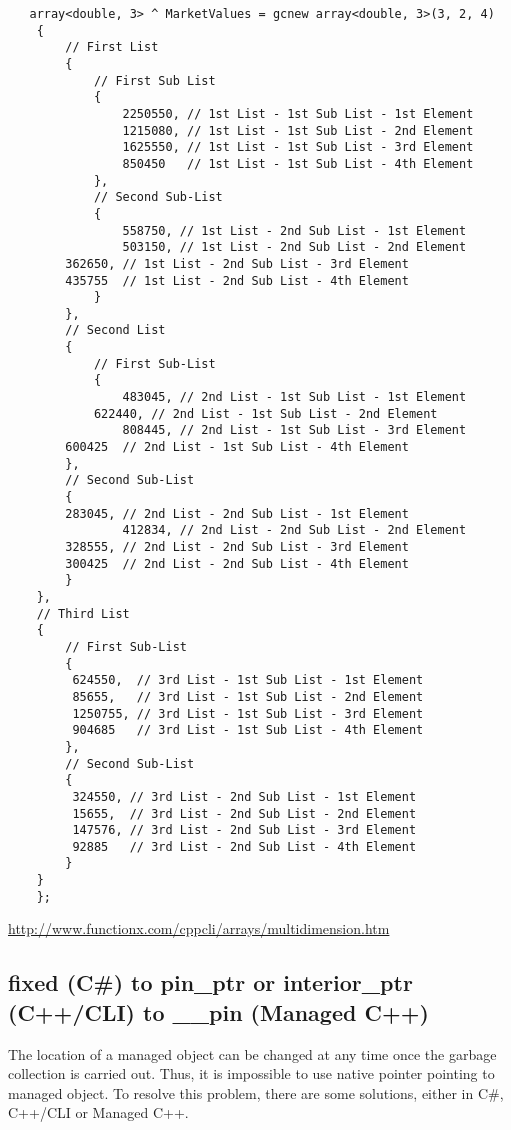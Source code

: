 \begin{verbatim}
   array<double, 3> ^ MarketValues = gcnew array<double, 3>(3, 2, 4)
    {
        // First List
        {
            // First Sub List
            {
                2250550, // 1st List - 1st Sub List - 1st Element
                1215080, // 1st List - 1st Sub List - 2nd Element
                1625550, // 1st List - 1st Sub List - 3rd Element
                850450   // 1st List - 1st Sub List - 4th Element
            },
            // Second Sub-List
            {
                558750, // 1st List - 2nd Sub List - 1st Element
                503150, // 1st List - 2nd Sub List - 2nd Element
		362650, // 1st List - 2nd Sub List - 3rd Element
		435755  // 1st List - 2nd Sub List - 4th Element
            }
        },
        // Second List
        {
            // First Sub-List
            {
                483045, // 2nd List - 1st Sub List - 1st Element
	        622440, // 2nd List - 1st Sub List - 2nd Element
                808445, // 2nd List - 1st Sub List - 3rd Element
		600425  // 2nd List - 1st Sub List - 4th Element
	    },
	    // Second Sub-List
	    {
		283045, // 2nd List - 2nd Sub List - 1st Element
                412834, // 2nd List - 2nd Sub List - 2nd Element
		328555, // 2nd List - 2nd Sub List - 3rd Element
		300425  // 2nd List - 2nd Sub List - 4th Element
	    }
	},
	// Third List
	{
	    // First Sub-List
	    {
		 624550,  // 3rd List - 1st Sub List - 1st Element
		 85655,   // 3rd List - 1st Sub List - 2nd Element
		 1250755, // 3rd List - 1st Sub List - 3rd Element
		 904685   // 3rd List - 1st Sub List - 4th Element
	    },
	    // Second Sub-List
	    {
		 324550, // 3rd List - 2nd Sub List - 1st Element
		 15655,  // 3rd List - 2nd Sub List - 2nd Element
		 147576, // 3rd List - 2nd Sub List - 3rd Element
		 92885   // 3rd List - 2nd Sub List - 4th Element
	    }
	}
    };
\end{verbatim}
\url{http://www.functionx.com/cppcli/arrays/multidimension.htm}

\subsection{fixed (C\#) to pin\_ptr or interior\_ptr (C++/CLI) to \_\_pin (Managed C++)}

The location of a managed object can be changed at any time once the garbage
collection is carried out. Thus, it is impossible to use native pointer pointing
to managed object. To resolve this problem, there are some solutions, either in C\#, C++/CLI or Managed C++.


